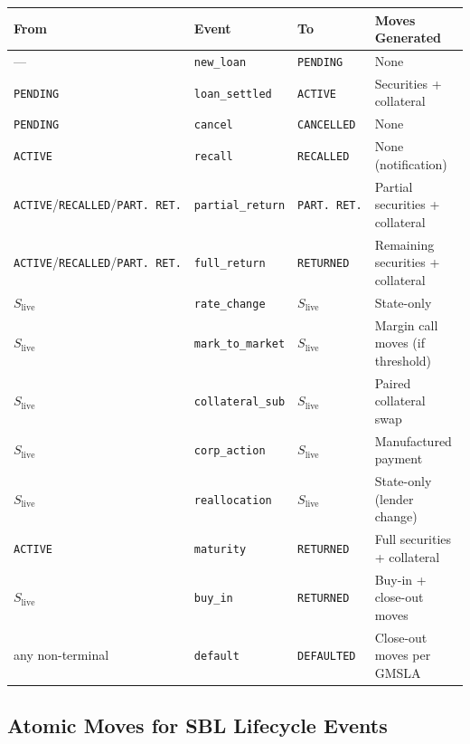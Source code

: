 \begin{center}
\small
\begin{tabular}{l l l l}
\toprule
\textbf{From} & \textbf{Event} & \textbf{To} & \textbf{Moves Generated} \\
\midrule
--- & \texttt{new\_loan} & \texttt{PENDING} & None \\
\texttt{PENDING} & \texttt{loan\_settled} & \texttt{ACTIVE} & Securities + collateral \\
\texttt{PENDING} & \texttt{cancel} & \texttt{CANCELLED} & None \\
\texttt{ACTIVE} & \texttt{recall} & \texttt{RECALLED} & None (notification) \\
\texttt{ACTIVE}/\texttt{RECALLED}/\texttt{PART.\ RET.} & \texttt{partial\_return} & \texttt{PART.\ RET.} & Partial securities + collateral \\
\texttt{ACTIVE}/\texttt{RECALLED}/\texttt{PART.\ RET.} & \texttt{full\_return} & \texttt{RETURNED} & Remaining securities + collateral \\
$S_{\mathrm{live}}$ & \texttt{rate\_change} & $S_{\mathrm{live}}$ & State-only \\
$S_{\mathrm{live}}$ & \texttt{mark\_to\_market} & $S_{\mathrm{live}}$ & Margin call moves (if threshold) \\
$S_{\mathrm{live}}$ & \texttt{collateral\_sub} & $S_{\mathrm{live}}$ & Paired collateral swap \\
$S_{\mathrm{live}}$ & \texttt{corp\_action} & $S_{\mathrm{live}}$ & Manufactured payment \\
$S_{\mathrm{live}}$ & \texttt{reallocation} & $S_{\mathrm{live}}$ & State-only (lender change) \\
\texttt{ACTIVE} & \texttt{maturity} & \texttt{RETURNED} & Full securities + collateral \\
$S_{\mathrm{live}}$ & \texttt{buy\_in} & \texttt{RETURNED} & Buy-in + close-out moves \\
any non-terminal & \texttt{default} & \texttt{DEFAULTED} & Close-out moves per GMSLA \\
\bottomrule
\end{tabular}
\end{center}

\subsection{Atomic Moves for SBL Lifecycle Events}
\label{sec:sbl-moves}

